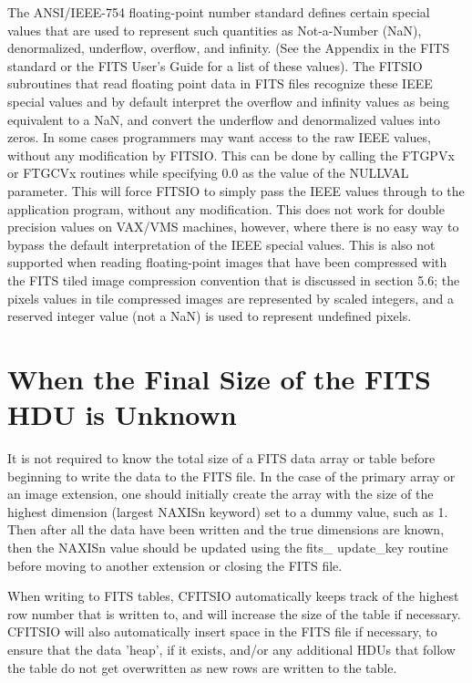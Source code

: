 \documentclass[11pt]{book}
\begin{document}
The ANSI/IEEE-754 floating-point number standard defines certain
special values that are used to represent such quantities as
Not-a-Number (NaN), denormalized, underflow, overflow, and infinity.
(See the Appendix in the  FITS standard or the FITS User's
Guide for a list of these values).  The FITSIO subroutines that read
floating point data in FITS files recognize these IEEE special values
and by default interpret the overflow and infinity values as being
equivalent to a NaN, and convert the underflow and denormalized values
into zeros.  In some cases programmers may want access to the raw IEEE
values, without any modification by FITSIO.  This can be done by
calling the FTGPVx or FTGCVx routines while specifying 0.0 as the value
of the NULLVAL parameter.  This will force FITSIO to simply pass the
IEEE values through to the application program, without any
modification.  This does not work for double precision values on
VAX/VMS machines, however, where there is no easy way to bypass the
default interpretation of the IEEE special values. This is also not
supported when reading floating-point images that have been compressed
with the FITS tiled image compression convention that is discussed in
section 5.6;  the pixels values in tile compressed images are
represented by scaled integers, and a reserved integer value
(not a NaN) is used to represent undefined pixels.



\section{When the Final Size of the FITS HDU is Unknown}

It is not required to know the total size of a FITS data array or table
before beginning to write the data to the FITS file.  In the case of
the primary array or an image extension, one should initially create
the array with the size of the highest dimension (largest NAXISn
keyword) set to a dummy value, such as 1.  Then after all the data have
been written and the true dimensions are known, then the NAXISn value
should be updated using the fits\_ update\_key routine before moving to
another extension or closing the FITS file.

When writing to FITS tables, CFITSIO automatically keeps track of the
highest row number that is written to, and will increase the size of
the table if necessary.  CFITSIO will also automatically insert space
in the FITS file if necessary, to ensure that the data 'heap', if it
exists, and/or any additional HDUs that follow the table do not get
overwritten as new rows are written to the table.
\end{document}
